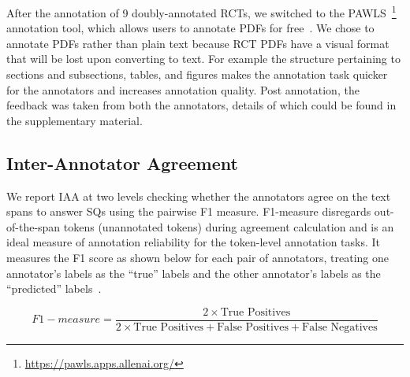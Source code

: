 \documentclass[sn-mathphys,Numbered]{sn-jnl}%
\theoremstyle{thmstyleone}%
\theoremstyle{thmstyletwo}%
\theoremstyle{thmstylethree}%
\begin{document}
After the annotation of 9 doubly-annotated RCTs, we switched to the PAWLS~\footnote{\url{https://pawls.apps.allenai.org/}} annotation tool, which allows users to annotate PDFs for free~\cite{neumann2021pawls}.
We chose to annotate PDFs rather than plain text because RCT PDFs have a visual format that will be lost upon converting to text. 
For example the structure pertaining to sections and subsections, tables, and figures makes the annotation task quicker for the annotators and increases annotation quality.
Post annotation, the feedback was taken from both the annotators, details of which could be found in the supplementary material.
%
%
%
\subsection{Inter-Annotator Agreement}
\label{method:iaa}
%
We report IAA at two levels checking whether the annotators agree on the text spans to answer SQs using the pairwise F1 measure.
F1-measure disregards out-of-the-span tokens (unannotated tokens) during agreement calculation and is an ideal measure of annotation reliability for the token-level annotation tasks.
It measures the F1 score as shown below for each pair of annotators, treating one annotator's labels as the ``true'' labels and the other annotator's labels as the ``predicted'' labels~\cite{deleger2012building,brandsen2020creating}.

\[ F1-measure = \frac{2 \times \text{True Positives}}{2 \times \text{True Positives} + \text{False Positives} + \text{False Negatives}} \]
\end{document}
